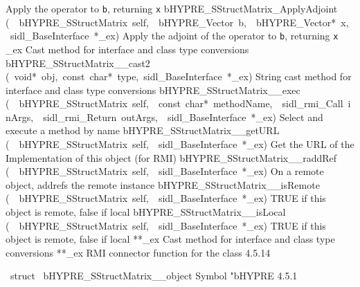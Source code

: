 \documentclass{article}
\begin{document}
\begin{cxxentry}
\begin{cxxentry}
\begin{cxxnames}
        {
Apply the operator to {\tt b}, returning {\tt x}}
        {}
\label{cxx.4.5.33}
        {bHYPRE\_SStructMatrix\_ApplyAdjoint}
        {(\ \ bHYPRE\_SStructMatrix\ self,\ \ bHYPRE\_Vector\ b,\ \ bHYPRE\_Vector*\ x,\ \ sidl\_BaseInterface\ *\_ex)}
        {
Apply the adjoint of the operator to {\tt b}, returning {\tt x}}
        {}
\label{cxx.4.5.34}
        {\_ex}
        {}
        {
Cast method for interface and class type conversions}
        {}
\label{cxx.4.5.35}
        {bHYPRE\_SStructMatrix\_\_cast2}
        {(\ void*\ obj,\ const\ char*\ type,\ sidl\_BaseInterface\ *\_ex)}
        {
String cast method for interface and class type conversions}
        {}
\label{cxx.4.5.36}
        {bHYPRE\_SStructMatrix\_\_exec}
        {(\ \ bHYPRE\_SStructMatrix\ self,\ \ const\ char*\ methodName,\ \ sidl\_rmi\_Call\ inArgs,\ \ sidl\_rmi\_Return\ outArgs,\ \ sidl\_BaseInterface\ *\_ex)}
        {
Select and execute a method by name}
        {}
\label{cxx.4.5.37}
        {bHYPRE\_SStructMatrix\_\_getURL}
        {(\ \ bHYPRE\_SStructMatrix\ self,\ \ sidl\_BaseInterface\ *\_ex)}
        {
Get the URL of the Implementation of this object (for RMI)}
        {}
\label{cxx.4.5.38}
        {bHYPRE\_SStructMatrix\_\_raddRef}
        {(\ \ bHYPRE\_SStructMatrix\ self,\ \ sidl\_BaseInterface\ *\_ex)}
        {
On a remote object, addrefs the remote instance}
        {}
\label{cxx.4.5.39}
        {bHYPRE\_SStructMatrix\_\_isRemote}
        {(\ \ bHYPRE\_SStructMatrix\ self,\ \ sidl\_BaseInterface\ *\_ex)}
        {
TRUE if this object is remote, false if local}
        {}
\label{cxx.4.5.40}
        {bHYPRE\_SStructMatrix\_\_isLocal}
        {(\ \ bHYPRE\_SStructMatrix\ self,\ \ sidl\_BaseInterface\ *\_ex)}
        {
TRUE if this object is remote, false if local}
        {}
\label{cxx.4.5.41}
        {**\_ex}
        {}
        {
Cast method for interface and class type conversions}
        {}
\label{cxx.4.5.42}
        {**\_ex}
        {}
        {
RMI connector function for the class}
        {4.5.14}
\end{cxxnames}
\begin{cxxvariable}
{\ struct\ }
        {bHYPRE\_SStructMatrix\_\_object}
        {}
        {
Symbol "bHYPRE}
        {4.5.1}
\begin{cxxdoc}


\end{cxxdoc}
\end{cxxvariable}
\end{cxxentry}
\end{cxxentry}
\end{document}
